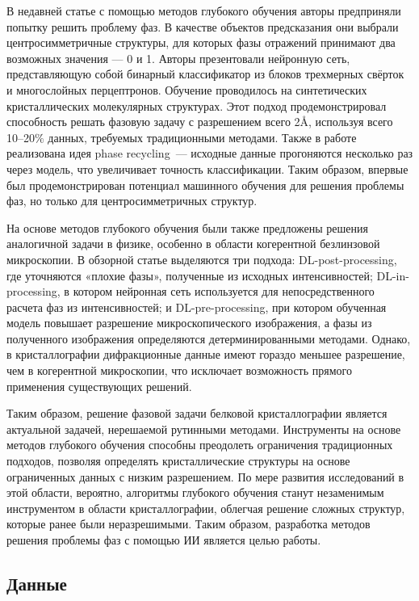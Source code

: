 \documentclass[a4paper,12pt]{article}
\begin{document}
{В недавней статье \cite{science} с помощью методов глубокого обучения авторы предприняли попытку решить проблему фаз. В качестве объектов предсказания они выбрали центросимметричные структуры, для которых фазы отражений принимают два возможных значения --- 0 и 1. Авторы презентовали нейронную сеть, представляющую собой бинарный классификатор из блоков трехмерных свёрток и многослойных перцептронов. Обучение проводилось на синтетических кристаллических молекулярных структурах. Этот подход продемонстрировал способность решать фазовую задачу с разрешением всего 2$\text{\AA}$, используя всего 10--20$\text{\%}$ данных, требуемых традиционными методами. Также в работе реализована идея phase recycling~--- исходные данные прогоняются несколько раз через модель, что увеличивает точность классификации. Таким образом, впервые был продемонстрирован потенциал машинного обучения для решения проблемы фаз, но только для центросимметричных структур.

На основе методов глубокого обучения были также предложены решения аналогичной задачи в физике, особенно в области когерентной безлинзовой микроскопии. В обзорной статье \cite{review_physics} выделяются три подхода: DL-post-processing, где уточняются «плохие фазы», полученные из исходных интенсивностей; DL-in-processing, в котором нейронная сеть используется для непосредственного расчета фаз из интенсивностей; и DL-pre-processing, при котором обученная модель повышает разрешение микроскопического изображения, а фазы из полученного изображения определяются детерминированными методами. Однако, в кристаллографии дифракционные данные имеют гораздо меньшее разрешение, чем в когерентной микроскопии, что исключает возможность прямого применения существующих решений.

Таким образом, решение фазовой задачи белковой кристаллографии является актуальной задачей, нерешаемой рутинными методами. Инструменты на основе методов глубокого обучения способны преодолеть ограничения традиционных подходов, позволяя определять кристаллические структуры на основе ограниченных данных с низким разрешением. По мере развития исследований в этой области, вероятно, алгоритмы глубокого обучения станут незаменимым инструментом в области кристаллографии, облегчая решение сложных структур, которые ранее были неразрешимыми. Таким образом, разработка методов решения проблемы фаз с помощью ИИ является целью работы. 

\subsection*{Данные}

}
\end{document}
